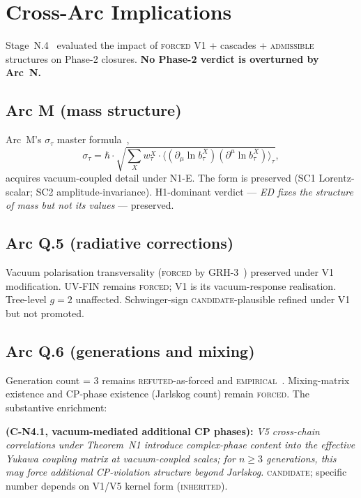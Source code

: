 \documentclass[11pt,a4paper]{article}
\begin{document}
\section{Cross-Arc Implications}

Stage~N.4~\cite{n4} evaluated the impact of \textsc{forced} V1 + cascades + \textsc{admissible} structures on Phase-2 closures. \textbf{No Phase-2 verdict is overturned by Arc~N.}

\subsection{Arc M (mass structure)}

Arc~M's $\sigma_\tau$ master formula~\cite{arcm},
\begin{equation}
\sigma_\tau = \hbar \cdot \sqrt{\sum_X w_\tau^X \cdot \langle (\partial_\mu \ln b_\tau^X)(\partial^\mu \ln b_\tau^X) \rangle_\tau},
\end{equation}
acquires vacuum-coupled detail under N1-E. The form is preserved (SC1 Lorentz-scalar; SC2 amplitude-invariance). H1-dominant verdict --- \emph{ED fixes the structure of mass but not its values} --- preserved.

\subsection{Arc Q.5 (radiative corrections)}

Vacuum polarisation transversality (\textsc{forced} by GRH-3~\cite{arcq}) preserved under V1 modification. UV-FIN remains \textsc{forced}; V1 is its vacuum-response realisation. Tree-level $g = 2$ unaffected. Schwinger-sign \textsc{candidate}-plausible refined under V1 but not promoted.

\subsection{Arc Q.6 (generations and mixing)}

Generation count = 3 remains \textsc{refuted}-as-forced and \textsc{empirical}~\cite{arcq}. Mixing-matrix existence and CP-phase existence (Jarlskog count) remain \textsc{forced}. The substantive enrichment:

\textbf{(C-N4.1, vacuum-mediated additional CP phases):} \emph{V5 cross-chain correlations under Theorem~N1 introduce complex-phase content into the effective Yukawa coupling matrix at vacuum-coupled scales; for $n \geq 3$ generations, this may force additional CP-violation structure beyond Jarlskog.} \textsc{candidate}; specific number depends on V1/V5 kernel form (\textsc{inherited}).
\end{document}

